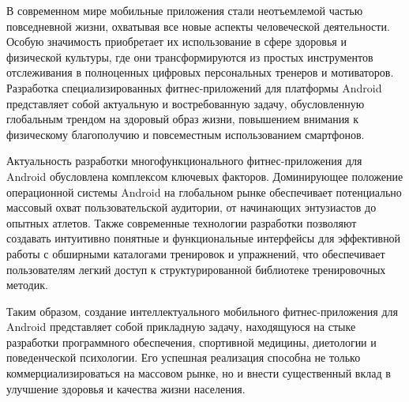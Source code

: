 
В современном мире мобильные приложения стали неотъемлемой частью повседневной жизни, охватывая все новые аспекты человеческой деятельности. Особую значимость приобретает их использование в сфере здоровья и физической культуры, где они трансформируются из простых инструментов отслеживания в полноценных цифровых персональных тренеров и мотиваторов. Разработка специализированных фитнес-приложений для платформы Android представляет собой актуальную и востребованную задачу, обусловленную глобальным трендом на здоровый образ жизни, повышением внимания к физическому благополучию и повсеместным использованием смартфонов.

Актуальность разработки многофункционального фитнес-приложения для Android обусловлена комплексом ключевых факторов. Доминирующее положение операционной системы Android на глобальном рынке обеспечивает потенциально массовый охват пользовательской аудитории, от начинающих энтузиастов до опытных атлетов. Также современные технологии разработки позволяют создавать интуитивно понятные и функциональные интерфейсы для эффективной работы с обширными каталогами тренировок и упражнений, что обеспечивает пользователям легкий доступ к структурированной библиотеке тренировочных методик.

Таким образом, создание интеллектуального мобильного фитнес-приложения для Android представляет собой прикладную задачу, находящуюся на стыке разработки программного обеспечения, спортивной медицины, диетологии и поведенческой психологии. Его успешная реализация способна не только коммерциализироваться на массовом рынке, но и внести существенный вклад в улучшение здоровья и качества жизни населения.